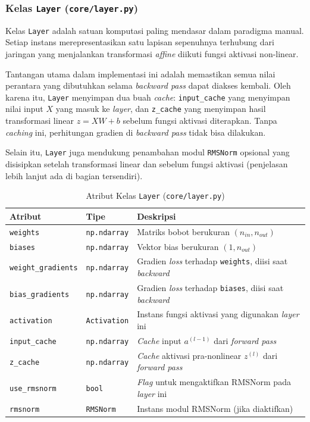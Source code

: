 \subsubsection{Kelas \texttt{Layer} (\texttt{core/layer.py})}

Kelas \texttt{Layer} adalah satuan komputasi paling mendasar dalam paradigma manual. Setiap instans merepresentasikan satu lapisan sepenuhnya terhubung dari jaringan yang menjalankan transformasi \textit{affine} diikuti fungsi aktivasi non-linear.

Tantangan utama dalam implementasi ini adalah memastikan semua nilai perantara yang dibutuhkan selama \textit{backward pass} dapat diakses kembali. Oleh karena itu, \texttt{Layer} menyimpan dua buah \textit{cache}: \texttt{input\_cache} yang menyimpan nilai input $X$ yang masuk ke \textit{layer}, dan \texttt{z\_cache} yang menyimpan hasil transformasi linear $z = XW + b$ sebelum fungsi aktivasi diterapkan. Tanpa \textit{caching} ini, perhitungan gradien di \textit{backward pass} tidak bisa dilakukan.

Selain itu, \texttt{Layer} juga mendukung penambahan modul \texttt{RMSNorm} opsional yang disisipkan setelah transformasi linear dan sebelum fungsi aktivasi (penjelasan lebih lanjut ada di bagian tersendiri).

\begin{table}[H]
    \centering
    \caption{Atribut Kelas \texttt{Layer} (\texttt{core/layer.py})}
    \begin{tabular}{lll}
        \toprule
        \textbf{Atribut} & \textbf{Tipe} & \textbf{Deskripsi} \\
        \midrule
        \texttt{weights} & \texttt{np.ndarray} & Matriks bobot berukuran $(n_{in}, n_{out})$ \\
        \texttt{biases} & \texttt{np.ndarray} & Vektor bias berukuran $(1, n_{out})$ \\
        \texttt{weight\_gradients} & \texttt{np.ndarray} & Gradien \textit{loss} terhadap \texttt{weights}, diisi saat \textit{backward} \\
        \texttt{bias\_gradients} & \texttt{np.ndarray} & Gradien \textit{loss} terhadap \texttt{biases}, diisi saat \textit{backward} \\
        \texttt{activation} & \texttt{Activation} & Instans fungsi aktivasi yang digunakan \textit{layer} ini \\
        \texttt{input\_cache} & \texttt{np.ndarray} & \textit{Cache} input $a^{(l-1)}$ dari \textit{forward pass} \\
        \texttt{z\_cache} & \texttt{np.ndarray} & \textit{Cache} aktivasi pra-nonlinear $z^{(l)}$ dari \textit{forward pass} \\
        \texttt{use\_rmsnorm} & \texttt{bool} & \textit{Flag} untuk mengaktifkan RMSNorm pada \textit{layer} ini \\
        \texttt{rmsnorm} & \texttt{RMSNorm} & Instans modul RMSNorm (jika diaktifkan) \\
        \bottomrule
    \end{tabular}
    \label{tab:layer-attr}
\end{table}

